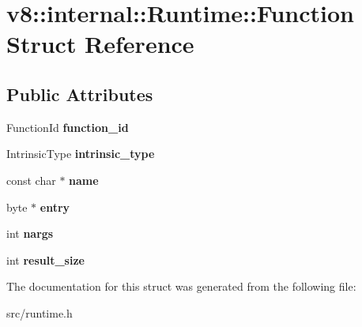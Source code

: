 \hypertarget{structv8_1_1internal_1_1_runtime_1_1_function}{}\section{v8\+:\+:internal\+:\+:Runtime\+:\+:Function Struct Reference}
\label{structv8_1_1internal_1_1_runtime_1_1_function}
\subsection*{Public Attributes}
\begin{DoxyCompactItemize}
\item 
\hypertarget{structv8_1_1internal_1_1_runtime_1_1_function_a713ac5d134215cd5c1e4e4414a530e63}{}Function\+Id {\bfseries function\+\_\+id}\label{structv8_1_1internal_1_1_runtime_1_1_function_a713ac5d134215cd5c1e4e4414a530e63}

\item 
\hypertarget{structv8_1_1internal_1_1_runtime_1_1_function_aa1d4b01b27002015b6148f7097cee1ad}{}Intrinsic\+Type {\bfseries intrinsic\+\_\+type}\label{structv8_1_1internal_1_1_runtime_1_1_function_aa1d4b01b27002015b6148f7097cee1ad}

\item 
\hypertarget{structv8_1_1internal_1_1_runtime_1_1_function_a8d7a71e9b81c63cef8006a5e8580745f}{}const char $\ast$ {\bfseries name}\label{structv8_1_1internal_1_1_runtime_1_1_function_a8d7a71e9b81c63cef8006a5e8580745f}

\item 
\hypertarget{structv8_1_1internal_1_1_runtime_1_1_function_af8da59e743ace0172f09dafade1543c1}{}byte $\ast$ {\bfseries entry}\label{structv8_1_1internal_1_1_runtime_1_1_function_af8da59e743ace0172f09dafade1543c1}

\item 
\hypertarget{structv8_1_1internal_1_1_runtime_1_1_function_a25d4fbcfb2326bf00de55840683ec3c0}{}int {\bfseries nargs}\label{structv8_1_1internal_1_1_runtime_1_1_function_a25d4fbcfb2326bf00de55840683ec3c0}

\item 
\hypertarget{structv8_1_1internal_1_1_runtime_1_1_function_aac92af3f9d0fd03c7609d664372872fb}{}int {\bfseries result\+\_\+size}\label{structv8_1_1internal_1_1_runtime_1_1_function_aac92af3f9d0fd03c7609d664372872fb}

\end{DoxyCompactItemize}


The documentation for this struct was generated from the following file\+:\begin{DoxyCompactItemize}
\item 
src/runtime.\+h\end{DoxyCompactItemize}
